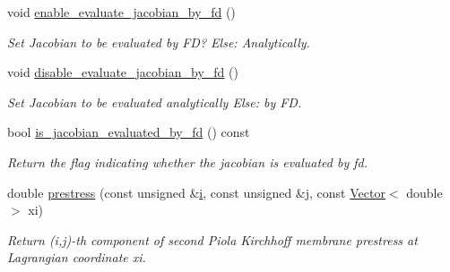 \begin{DoxyCompactItemize}
void \hyperlink{classoomph_1_1PVDEquationsBase_ae3a43aed7cc42dac606e14ab90bb1c08}{enable\+\_\+evaluate\+\_\+jacobian\+\_\+by\+\_\+fd} ()
\begin{DoxyCompactList}\small\item\em Set Jacobian to be evaluated by FD? Else\+: Analytically. \end{DoxyCompactList}\item 
void \hyperlink{classoomph_1_1PVDEquationsBase_a22241bad7ba70687a5f92e084da67c14}{disable\+\_\+evaluate\+\_\+jacobian\+\_\+by\+\_\+fd} ()
\begin{DoxyCompactList}\small\item\em Set Jacobian to be evaluated analytically Else\+: by FD. \end{DoxyCompactList}\item 
bool \hyperlink{classoomph_1_1PVDEquationsBase_a3549cf43c725bf6742ee5a62c0016f1c}{is\+\_\+jacobian\+\_\+evaluated\+\_\+by\+\_\+fd} () const
\begin{DoxyCompactList}\small\item\em Return the flag indicating whether the jacobian is evaluated by fd. \end{DoxyCompactList}\item 
double \hyperlink{classoomph_1_1PVDEquationsBase_a4e3c80ea73dca7695dadc78fad7825f9}{prestress} (const unsigned \&\hyperlink{cfortran_8h_adb50e893b86b3e55e751a42eab3cba82}{i}, const unsigned \&j, const \hyperlink{classoomph_1_1Vector}{Vector}$<$ double $>$ xi)
\begin{DoxyCompactList}\small\item\em Return (i,j)-\/th component of second Piola Kirchhoff membrane prestress at Lagrangian coordinate xi. \end{DoxyCompactList}\end{DoxyCompactItemize}
